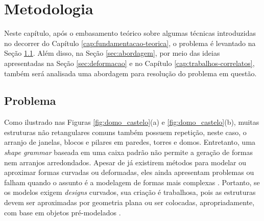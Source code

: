 \chapter{Metodologia}
\label{chap:metodologia}

Neste capítulo, após o embasamento teórico sobre algumas técnicas introduzidas no decorrer do Capítulo \ref{cap:fundamentacao-teorica}, o problema é levantado na Seção \ref{sec:problema}. Além disso, na Seção \ref{sec:abordagem}, por meio das ideias apresentadas na Seção \ref{sec:deformacao} e no Capítulo \ref{cap:trabalhos-correlatos}, também será analisada uma abordagem para resolução do problema em questão.

\section{Problema}
\label{sec:problema}

Como ilustrado nas Figuras \ref{fig:domo_castelo}(a) e \ref{fig:domo_castelo}(b), muitas estruturas não retangulares comuns também possuem repetição, neste caso, o arranjo de janelas, blocos e pilares em paredes, torres e domos. Entretanto, uma \textit{shape grammar} baseada em uma caixa padrão não permite a geração de formas nem arranjos arredondados. Apesar de já existirem métodos para modelar ou aproximar formas curvadas ou deformadas, eles ainda apresentam problemas ou falham quando o assunto é a modelagem de formas mais complexas \cite{edelsbrunner2017}. Portanto, se os modelos exigem \textit{designs} curvados, sua criação é trabalhosa, pois as estruturas devem ser aproximadas por geometria plana ou ser colocadas, apropriadamente, com base em objetos pré-modelados \cite{zmugg2014}.

\begin{figure}[h!]
	\centering
	\captionsetup{width=15cm}
	{}	
\end{figure}

